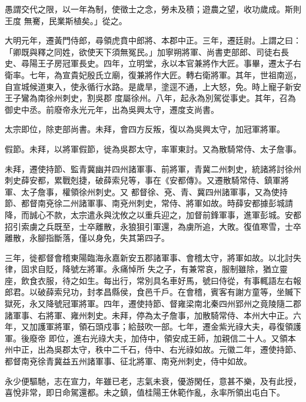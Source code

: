 \begin{pinyinscope}
 愚謂交代之限，以一年為制，使徵士之念，勞未及積；遊農之望，收功歲成。斯則王度
 無騫，民業斯植矣。」從之。



 大明元年，遷黃門侍郎，尋領虎賁中郎將、本郡中正。三年，遷廷尉。上謂之曰：「卿既與釋之同姓，欲使天下須無冤民。」加寧朔將軍、尚書吏部郎、司徒右長史、尋陽王子房冠軍長史。四年，立明堂，永以本官兼將作大匠。事畢，遷太子右衛率。七年，為宣貴妃殷氏立廟，復兼將作大匠。轉右衛將軍。其年，世祖南巡，自宣城候道東入，使永循行水路。是歲旱，塗逕不通，上大怒，免。時上寵子新安王子鸞為南徐州刺史，割吳郡
 度屬徐州。八年，起永為別駕從事史。其年，召為御史中丞。前廢帝永光元年，出為吳興太守，遷度支尚書。



 太宗即位，除吏部尚書。未拜，會四方反叛，復以為吳興太守，加冠軍將軍。



 假節。未拜，以將軍假節，徙為吳郡太守，率軍東討。又為散騎常侍、太子詹事。



 未拜，遷使持節、監青冀幽并四州諸軍事、前將軍，青冀二州刺史，統諸將討徐州刺史薛安都，累戰剋捷，破薛索兒等，事在《安都傳》。又遷散騎常侍、鎮軍將軍、太子詹事，權領徐州刺史。又
 都督徐、兗、青、冀四州諸軍事，又為使持節、都督南兗徐二州諸軍事、南兗州刺史，常侍、將軍如故。時薛安都據彭城請降，而誠心不款，太宗遣永與沈攸之以重兵迎之，加督前鋒軍事，進軍彭城。安都招引索虜之兵既至，士卒離散，永狼狽引軍還，為虜所追，大敗。復值寒雪，士卒離散，永腳指斷落，僅以身免，失其第四子。



 三年，徙都督會稽東陽臨海永嘉新安五郡諸軍事、會稽太守，將軍如故。以北討失律，固求自貶，降號左將軍。永痛悼所
 失之子，有兼常哀，服制雖除，猶立靈座，飲食衣服，待之如生。每出行，常別具名車好馬，號曰侍從，有事輒語左右報郎君。以破薛索兒功，封孝昌縣侯，食邑千戶。在會稽，賓客有謝方童等，坐贓下獄死，永又降號冠軍將軍。四年，遷使持節、督雍梁南北秦四州郢州之竟陵隨二郡諸軍事、右將軍、雍州刺史。未拜，停為太子詹事，加散騎常侍、本州大中正。六年，又加護軍將軍，領石頭戍事；給鼓吹一部。七年，遷金紫光祿大夫，尋復領護軍。後廢帝
 即位，進右光祿大夫，加侍中，領安成王師，加親信二十人。又領本州中正，出為吳郡太守，秩中二千石，侍中、右光祿如故。元徽二年，遷使持節、都督南兗徐青冀益五州諸軍事、征北將軍、南兗州刺史，侍中如故。



 永少便驅馳，志在宣力，年雖已老，志氣未衰，優游閑任，意甚不樂，及有此授，喜悅非常，即日命駕還都。未之鎮，值桂陽王休範作亂，永率所領出屯白下。




\end{pinyinscope}
